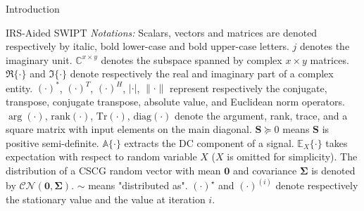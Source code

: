 \documentclass[journal]{IEEEtran}
\begin{document}
\begin{section}{Introduction}
\begin{subsection}{IRS-Aided SWIPT}
			\emph{Notations:} Scalars, vectors and matrices are denoted respectively by italic, bold lower-case and bold upper-case letters. $j$ denotes the imaginary unit. $\mathbb{C}^{x \times y}$ denotes the subspace spanned by complex $x \times y$ matrices. $\Re\{\cdot\}$ and $\Im\{\cdot\}$ denote respectively the real and imaginary part of a complex entity. $(\cdot)^*$, $(\cdot)^T$, $(\cdot)^H$, $\lvert{\cdot}\rvert$, $\lVert{\cdot}\rVert$ represent respectively the conjugate, transpose, conjugate transpose, absolute value, and Euclidean norm operators. $\arg(\cdot)$, $\mathrm{rank}(\cdot)$, $\mathrm{Tr}(\cdot)$, $\mathrm{diag}(\cdot)$ denote the argument, rank, trace, and a square matrix with input elements on the main diagonal. $\boldsymbol{S} \succeq 0$ means $\boldsymbol{S}$ is positive semi-definite. $\mathbb{A}\{\cdot\}$ extracts the DC component of a signal. $\mathbb{E}_X\{\cdot\}$ takes expectation with respect to random variable $X$ ($X$ is omitted for simplicity). The distribution of a CSCG random vector with mean $\boldsymbol{0}$ and covariance $\boldsymbol{\Sigma}$ is denoted by $\mathcal{CN}(\boldsymbol{0},\boldsymbol{\Sigma})$. $\sim$ means "distributed as". $(\cdot)^{\star}$ and $(\cdot)^{(i)}$ denote respectively the stationary value and the value at iteration $i$.
		\end{subsection}
	\end{section}
\end{document}

